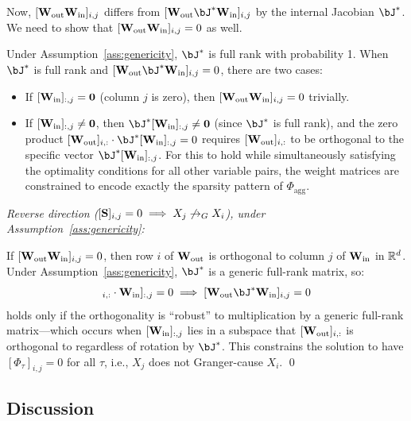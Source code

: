Now, $[\mathbf{W}_{\text{out}} \mathbf{W}_{\text{in}}]_{i,j}$ differs from
$[\bW_{\text{out}} \bJ^* \bW_{\text{in}}]_{i,j}$ by the internal
Jacobian $\bJ^*$. We need to show that
$[\mathbf{W}_{\text{out}} \mathbf{W}_{\text{in}}]_{i,j} = 0$ as well.

Under Assumption~\ref{ass:genericity}, $\bJ^*$ is full rank with
probability 1. When $\bJ^*$ is full rank and
$[\bW_{\text{out}} \bJ^* \bW_{\text{in}}]_{i,j} = 0$, there are
two cases:
\begin{itemize}
    \item If $[\mathbf{W}_{\text{in}}]_{:,j} = \mathbf{0}$ (column $j$ is
    zero), then $[\mathbf{W}_{\text{out}} \mathbf{W}_{\text{in}}]_{i,j} = 0$
    trivially.
    \item If $[\mathbf{W}_{\text{in}}]_{:,j} \neq \mathbf{0}$, then
    $\bJ^* [\bW_{\text{in}}]_{:,j} \neq \mathbf{0}$ (since $\bJ^*$
    is full rank), and the zero product
    $[\bW_{\text{out}}]_{i,:} \cdot \bJ^* [\bW_{\text{in}}]_{:,j} = 0$
    requires $[\mathbf{W}_{\text{out}}]_{i,:}$ to be orthogonal to the
    specific vector $\bJ^* [\bW_{\text{in}}]_{:,j}$. For this to
    hold while simultaneously satisfying the optimality conditions
    for all other variable pairs, the weight matrices are constrained
    to encode exactly the sparsity pattern of $\Phi_{\text{agg}}$.
\end{itemize}

\emph{Reverse direction ($[\mathbf{S}]_{i,j} = 0 \implies
X_j \not\to_G X_i$), under Assumption~\ref{ass:genericity}:}

If $[\mathbf{W}_{\text{out}} \mathbf{W}_{\text{in}}]_{i,j} = 0$, then row $i$ of
$\mathbf{W}_{\text{out}}$ is orthogonal to column $j$ of $\mathbf{W}_{\text{in}}$
in $\mathbb{R}^d$. Under Assumption~\ref{ass:genericity}, $\bJ^*$ is a
generic full-rank matrix, so:
\begin{equation}
    [\bW_{\text{out}}]_{i,:} \cdot \bW_{\text{in}}]_{:,j} = 0
    \implies [\bW_{\text{out}} \bJ^* \bW_{\text{in}}]_{i,j} = 0
\end{equation}
holds only if the orthogonality is ``robust'' to multiplication by
a generic full-rank matrix---which occurs when $[\mathbf{W}_{\text{in}}]_{:,j}$
lies in a subspace that $[\mathbf{W}_{\text{out}}]_{i,:}$ is orthogonal to
regardless of rotation by $\bJ^*$. This constrains the solution to
have $[\Phi_\tau]_{i,j} = 0$ for all $\tau$, i.e.,
$X_j$ does not Granger-cause $X_i$. \qed

\subsection*{Discussion}

